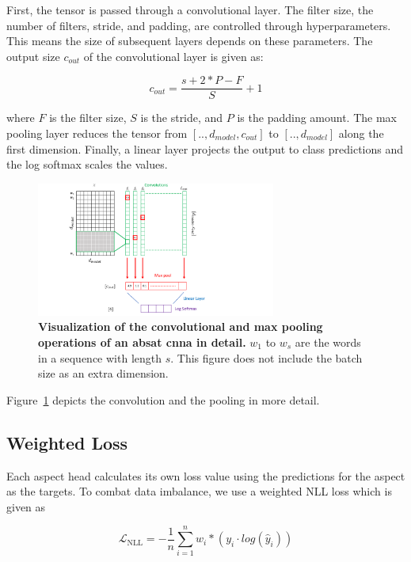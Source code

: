 First, the tensor is passed through a convolutional layer. The filter size, the number of filters, stride, and padding, are controlled through hyperparameters. This means the size of subsequent layers depends on these parameters. The output size $c_{out}$ of the convolutional layer is given as:

\begin{equation}
    c_{out} = \frac{s+2*P-F}{S} + 1
\end{equation}

where $F$ is the filter size, $S$ is the stride, and $P$ is the padding amount. The max pooling layer reduces the tensor from $[.., d_{model}, c_{out}]$ to $[.., d_{model}]$ along the first dimension. Finally, a linear layer projects the output to class predictions and the log softmax scales the values.
\medskip

\begin{figure}[htp]
    \centering
    \includegraphics[width=0.7\textwidth]{figures/04_method/04_ch2}
    \caption{\textbf{Visualization of the convolutional and max pooling operations of an \gls{absat} \gls{cnna} in detail.} $w_1$ to $w_s$ are the words in a sequence with length $s$. This figure does not include the batch size as an extra dimension.}
    \label{fig:04_ch2}
\end{figure}

Figure~\ref{fig:04_ch2} depicts the convolution and the pooling in more detail.

\subsection{Weighted Loss}

Each aspect head calculates its own loss value using the predictions for the aspect as the targets. To combat data imbalance, we use a weighted NLL loss which is given as

\begin{equation}
\mathcal{L}_\text{NLL}=-\frac{1}{n}\sum_{i=1}^{n} w_i * (y_i \cdot log(\hat{y}_i))
\label{eq:04_nll}
\end{equation}


